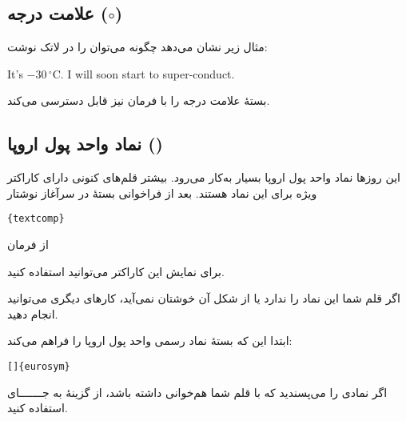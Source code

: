 \subsection{\texorpdfstring{علامت درجه ($\circ$)}{علامت درجه}}
مثال زیر نشان می‌دهد چگونه می‌توان  
 را در لاتک نوشت:


\begin{example}
It's $-30\,^{\circ}\mathrm{C}$.
I will soon start to
super-conduct.
\end{example}


بستهٔ  علامت درجه را با فرمان   نیز قابل دسترسی می‌کند.
\subsection{\texorpdfstring{نماد واحد پول اروپا (\lr{\texteuro})}{نماد واحد پول اروپا}}
این روزها نماد واحد پول اروپا بسیار به‌کار می‌رود. بیشتر قلم‌‌های کنونی دارای کاراکتر ویژه برای این نماد هستند. بعد از فراخوانی بستهٔ 
در سرآغاز نوشتار

\begin{lscommand}
\verb|{textcomp}| 
\end{lscommand}

از فرمان 

\begin{lscommand}
\end{lscommand}

برای نمایش این کاراکتر می‌توانید استفاده کنید.

اگر قلم شما این نماد را ندارد یا از شکل آن خوشتان نمی‌آید، کارهای دیگری می‌توانید انجام دهید.

ابتدا این که بستهٔ
نماد رسمی واحد پول اروپا را فراهم می‌کند:

\begin{lscommand}
\verb|[|\verb|]{eurosym}|
\end{lscommand}

اگر نمادی را می‌پسندید  که با قلم شما هم‌خوانی داشته باشد، از گزینهٔ 
به جـــــــای 
استفاده کنید.


